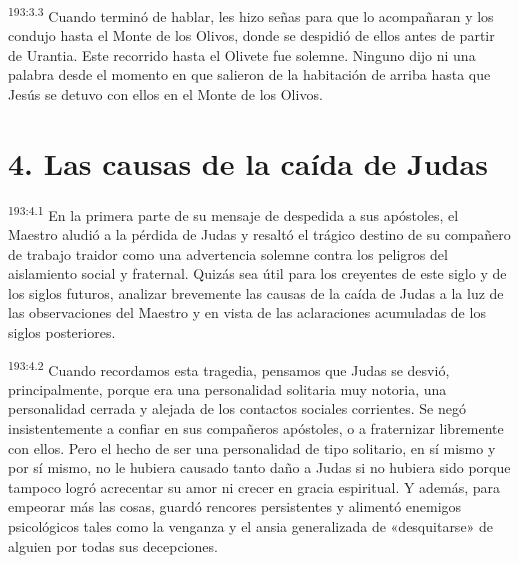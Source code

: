 \par
\textsuperscript{193:3.3} Cuando terminó de hablar, les hizo señas para que lo acompañaran y los condujo hasta el Monte de los Olivos, donde se despidió de ellos antes de partir de Urantia. Este recorrido hasta el Olivete fue solemne. Ninguno dijo ni una palabra desde el momento en que salieron de la habitación de arriba hasta que Jesús se detuvo con ellos en el Monte de los Olivos.

\section*{4. Las causas de la caída de Judas}
\par
\textsuperscript{193:4.1} En la primera parte de su mensaje de despedida a sus apóstoles, el Maestro aludió a la pérdida de Judas y resaltó el trágico destino de su compañero de trabajo traidor como una advertencia solemne contra los peligros del aislamiento social y fraternal. Quizás sea útil para los creyentes de este siglo y de los siglos futuros, analizar brevemente las causas de la caída de Judas a la luz de las observaciones del Maestro y en vista de las aclaraciones acumuladas de los siglos posteriores.

\par
\textsuperscript{193:4.2} Cuando recordamos esta tragedia, pensamos que Judas se desvió, principalmente, porque era una personalidad solitaria muy notoria, una personalidad cerrada y alejada de los contactos sociales corrientes. Se negó insistentemente a confiar en sus compañeros apóstoles, o a fraternizar libremente con ellos. Pero el hecho de ser una personalidad de tipo solitario, en sí mismo y por sí mismo, no le hubiera causado tanto daño a Judas si no hubiera sido porque tampoco logró acrecentar su amor ni crecer en gracia espiritual. Y además, para empeorar más las cosas, guardó rencores persistentes y alimentó enemigos psicológicos tales como la venganza y el ansia generalizada de «desquitarse» de alguien por todas sus decepciones.


